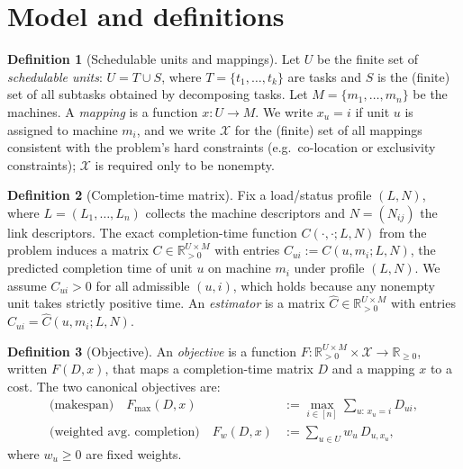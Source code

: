 \documentclass{amsart}
\theoremstyle{definition}
\newtheorem{definition}{Definition}
\newcommand{\Chat}{\widehat{C}}
\begin{document}
\section{Model and definitions}\label{sec:model}

\begin{definition}[Schedulable units and mappings]\label{def:units}
Let $U$ be the finite set of \emph{schedulable units}: $U = T \cup S$, where
$T=\{t_1,\dots,t_k\}$ are tasks and $S$ is the (finite) set of all subtasks
obtained by decomposing tasks. Let $M=\{m_1,\dots,m_n\}$ be the machines. A
\emph{mapping} is a function $x\colon U \to M$. We write $x_u=i$ if unit $u$ is
assigned to machine $m_i$, and we write $\mathcal{X}$ for the (finite) set of all
mappings consistent with the problem's hard constraints (e.g.\ co-location or
exclusivity constraints); $\mathcal X$ is required only to be nonempty.
\end{definition}

\begin{definition}[Completion-time matrix]\label{def:cmatrix}
Fix a load/status profile $(L,N)$, where $L=(L_1,\dots,L_n)$ collects the machine
descriptors and $N=(N_{ij})$ the link descriptors. The exact completion-time
function $C(\cdot,\cdot;L,N)$ from the problem induces a matrix
$C \in \mathbb{R}_{>0}^{U\times M}$ with entries $C_{ui} := C(u,m_i;L,N)$,
the predicted completion time of unit $u$ on machine $m_i$ under profile $(L,N)$.
We assume $C_{ui}>0$ for all admissible $(u,i)$, which holds because any
nonempty unit takes strictly positive time. An \emph{estimator} is a matrix
$\Chat\in\mathbb{R}_{>0}^{U\times M}$ with entries
$\Chat_{ui}=\Chat(u,m_i;L,N)$.
\end{definition}

\begin{definition}[Objective]\label{def:obj}
An \emph{objective} is a function
$F\colon \mathbb{R}_{>0}^{U\times M}\times\mathcal{X}\to\mathbb{R}_{\ge 0}$,
written $F(D,x)$, that maps a completion-time matrix $D$ and a mapping $x$ to a
cost. The two canonical objectives are:
\begin{align}
\text{(makespan)}\quad
F_{\max}(D,x) &:= \max_{i\in[n]} \sum_{u:\,x_u=i} D_{ui}, \label{eq:makespan}\\
\text{(weighted avg.\ completion)}\quad
F_{w}(D,x) &:= \sum_{u\in U} w_u\, D_{u,x_u}, \label{eq:wsum}
\end{align}
where $w_u\ge 0$ are fixed weights.
\end{definition}
\end{document}
